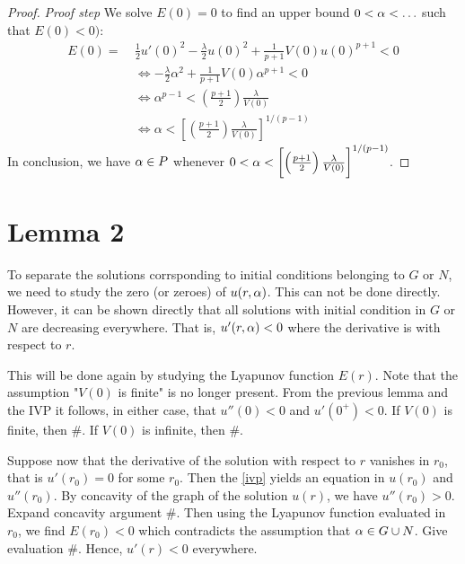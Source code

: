 \begin{proof}
\emph{Proof step} We solve $E(0)=0$ to find an upper bound $0<\alpha<\ldots$ such that $E(0)<0)$:
\begin{align*}
E(0)=~&\frac{1}{2}u'(0)^2-\frac{\lambda}{2}u(0)^2+\frac{1}{p+1}V(0)u(0)^{p+1}<0\\
&\iff -\frac{\lambda}{2}\alpha^2+\frac{1}{p+1}V(0)\alpha^{p+1}<0\\
&\iff\alpha^{p-1}<\left(\frac{p+1}{2}\right)\frac{\lambda}{V(0)}\\
&\iff\alpha<\left[\left(\frac{p+1}{2}\right)\frac{\lambda}{V(0)} \right]^{1/(p-1)}
%
\end{align*}
In conclusion, we have $\alpha\in P$ whenever $0<\alpha<\left[\left(\frac{p+1}{2}\right)\frac{\lambda}{V(0)}\right]^{1/(p-1)}$.
\end{proof}




\section{Lemma 2}
To separate the solutions corrsponding to initial conditions belonging to $G$ or $N$, we need to study the zero (or zeroes) of $u(r,\alpha)$. This can not be done directly. However, it can be shown directly that all solutions with initial condition in $G$ or $N$ are decreasing everywhere. That is, $u'(r,\alpha)<0$ where the derivative is with respect to $r$. 


This will be done again by studying the Lyapunov function $E(r)$. Note that the assumption "$V(0)$ is finite" is no longer present. From the previous lemma and the IVP it follows, in either case, that $u''(0)<0$ and $u'(0^+)<0$. If $V(0)$ is finite, then \#. If $V(0)$ is infinite, then \#. 

Suppose now that the derivative of the solution with respect to $r$ vanishes in $r_0$, that is $u'(r_0)=0$ for some $r_0$. Then the \cref{ivp} yields an equation in $u(r_0)$ and $u''(r_0)$. By concavity of the graph of the solution $u(r)$, we have $u''(r_0)>0$. Expand concavity argument \#. Then using the Lyapunov function evaluated in $r_0$, we find $E(r_0)<0$ which contradicts the assumption that $\alpha\in G\cup N$. Give evaluation \#. Hence, $u'(r)<0$ everywhere.

